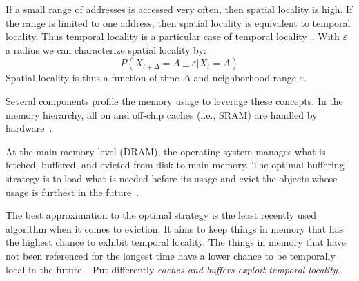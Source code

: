     If a small range of addresses is accessed very often, then spatial locality is high.
    If the range is limited to one address, then spatial locality is equivalent to temporal locality. Thus temporal locality is a particular case of temporal locality~\autocite{gupta2013locality}.
    With $\varepsilon$ a radius we can characterize spatial locality by:
    \[ P(X_{t + \Delta} = A \pm \varepsilon | X_t = A) \]
    Spatial locality is thus a function of time $\Delta$ and neighborhood range $\varepsilon$. 
    
    Several components profile the memory usage to leverage these concepts.
    In the memory hierarchy, all on and off-chip caches (i.e., SRAM) are handled by hardware~\autocite{jacob2010memory}.
    
    At the main memory level (DRAM), the operating system manages what is fetched, buffered, and evicted from disk to main memory. 
    The optimal buffering strategy is to load what is needed before its usage and evict the objects whose usage is furthest in the future~\autocite{tanenbaum2015modern}. 
    
    The best approximation to the optimal strategy is the least recently used algorithm when it comes to eviction. 
    It aims to keep things in memory that has the highest chance to exhibit temporal locality.
    The things in memory that have not been referenced for the longest time have a lower chance to be temporally local in the future~\autocite{silberschatz2006operating}.
    Put differently \textit{caches and buffers exploit temporal locality}.
    
